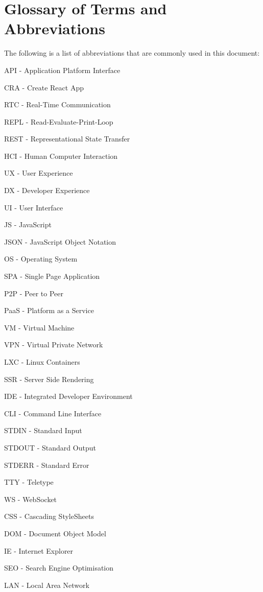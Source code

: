 \section{Glossary of Terms and Abbreviations}
The following is a list of abbreviations that are commonly used in this document:

API - Application Platform Interface

CRA - Create React App

RTC - Real-Time Communication

REPL - Read-Evaluate-Print-Loop

REST - Representational State Transfer

HCI - Human Computer Interaction

UX - User Experience

DX - Developer Experience

UI - User Interface

JS - JavaScript

JSON - JavaScript Object Notation

OS - Operating System

SPA - Single Page Application

P2P - Peer to Peer

PaaS - Platform as a Service

VM - Virtual Machine

VPN - Virtual Private Network

LXC - Linux Containers

SSR - Server Side Rendering

IDE - Integrated Developer Environment

CLI - Command Line Interface 

STDIN - Standard Input

STDOUT - Standard Output

STDERR - Standard Error

TTY - Teletype

WS - WebSocket

CSS - Cascading StyleSheets

DOM - Document Object Model

IE - Internet Explorer

SEO - Search Engine Optimisation

LAN - Local Area Network
\pagebreak
